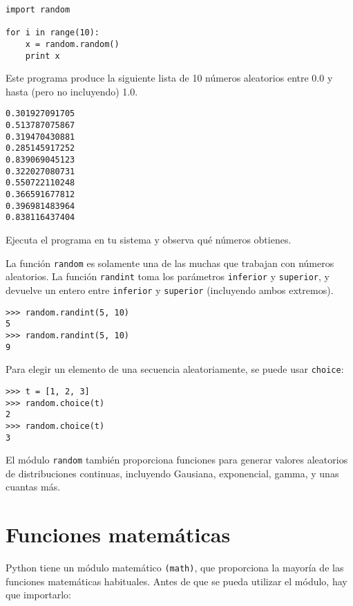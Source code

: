 \beforeverb
\begin{verbatim}
import random

for i in range(10):
    x = random.random()
    print x
\end{verbatim}
\afterverb
%
Este programa produce la siguiente lista de 10 números aleatorios
entre 0.0 y hasta (pero no incluyendo) 1.0.

\beforeverb
\begin{verbatim}
0.301927091705
0.513787075867
0.319470430881
0.285145917252
0.839069045123
0.322027080731
0.550722110248
0.366591677812
0.396981483964
0.838116437404
\end{verbatim}
\afterverb
%
\begin{ex}
Ejecuta el programa en tu sistema y observa qué números obtienes.
\end{ex}

La función {\tt random} es solamente una de las muchas
que trabajan con números aleatorios.
La función {\tt randint} toma los parámetros {\tt inferior} y
{\tt superior}, y devuelve un entero entre {\tt inferior} y 
{\tt superior} (incluyendo ambos extremos).


\beforeverb
\begin{verbatim}
>>> random.randint(5, 10)
5
>>> random.randint(5, 10)
9
\end{verbatim}
\afterverb
%
Para elegir un elemento de una secuencia aleatoriamente, se puede usar
{\tt choice}:


\beforeverb
\begin{verbatim}
>>> t = [1, 2, 3]
>>> random.choice(t)
2
>>> random.choice(t)
3
\end{verbatim}
\afterverb
%
El módulo {\tt random} también proporciona funciones para generar
valores aleatorios de distribuciones continuas, incluyendo
Gausiana, exponencial, gamma, y unas cuantas más.

\section{Funciones matemáticas}

Python tiene un módulo  matemático {\tt (math)}, que proporciona la mayoría
de las funciones matemáticas habituales.
Antes de que se pueda utilizar el módulo, hay que importarlo:

